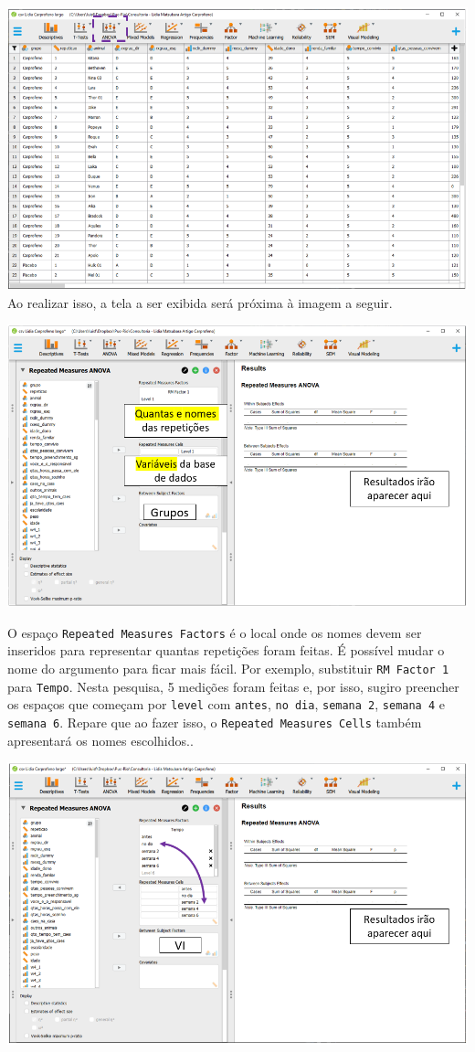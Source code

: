 \documentclass[
]{book}
\begin{document}
\includegraphics{./img/cap_anovarm_interface0.png} Ao realizar isso, a
tela a ser exibida será próxima à imagem a seguir.

\includegraphics{./img/cap_anovarm_interface.png}

O espaço \texttt{Repeated\ Measures\ Factors} é o local onde os nomes
devem ser inseridos para representar quantas repetições foram feitas. É
possível mudar o nome do argumento para ficar mais fácil. Por exemplo,
substituir \texttt{RM\ Factor\ 1} para \texttt{Tempo}. Nesta pesquisa, 5
medições foram feitas e, por isso, sugiro preencher os espaços que
começam por \texttt{level} com \texttt{antes}, \texttt{no\ dia},
\texttt{semana\ 2}, \texttt{semana\ 4} e \texttt{semana\ 6}. Repare que
ao fazer isso, o \texttt{Repeated\ Measures\ Cells} também apresentará
os nomes escolhidos..

\includegraphics{./img/cap_anovarm_interface2.png}
\end{document}
